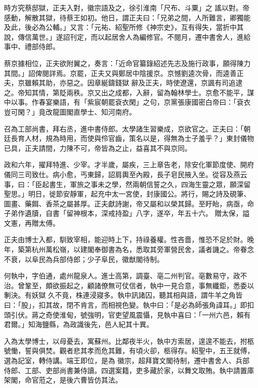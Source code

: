 \begin{pinyinscope}
 時方究蔡邸獄，正夫入對，徽宗語及之，徐引淮南「尺布、斗粟」之
 謠以對。帝感動，解散其獄，待蔡王如初。他日，謂正夫曰：「兄弟之間，人所難言，卿獨能及此，後必為公輔。」又言：「元祐、紹聖所修《神宗史》，互有得失，當折中其說，傳信萬世。」遂詔刊定，而以起居舍人為編修官。不閱月，遷中書舍人，進給事中、禮部侍郎。



 蔡京據相位，正夫欲附翼之，奏言：「近命官纂錄紹述先志及施行政事，願得陳力其間。」詔俾閱詳焉。京罷，正夫又與鄭居中陰援京。京憾劉逵次骨，而逵善正夫，京雖賴其助，亦惡之。因章綖鑄錢獄
 辭及正夫，時使遼還，京諷有司追逮之。帝知其情，第貶兩秩。京又出之成都，入辭，留為翰林學士。京愈不能平，謀中以事。作春宴樂語，有「紫宸朝罷袞衣閑」之句，京黨張康國密白帝曰：「袞衣豈可閑？」竟改龍圖閣直學士、知河南府。



 召為工部尚書，拜右丞，進中書侍郎。太學諸生習樂成，京欲官之。正夫曰：「朝廷長育人材，規為時用，而使與伶官齒，策名以是，得無為士子羞乎？」東封儀物已具，正夫請間，力陳不可，帝皆為之止，益喜其不與京同。



 政和六年，擢拜特進、少宰。才半歲，屬疾，三上章告老，除安化軍節度使、開府儀同三司致仕。病小愈，丐東歸，詔肩輿至內殿，長子皂民掖入坐。從容及燕云事，曰：「臣起書生，軍旅之事未之學，然兩朝信誓之久，四海生靈之眾，願深留聖思。」明日，徙節安靜軍，起充中太一宮使，封康國公。將行，賜之詩及硯筆、圖畫、藥餌、香茶之屬甚厚。正夫獻詩謝，帝又屬和以榮其歸。至盱眙，病亟，命子弟作遺牘，自書「留神根本，深戒持盈」八字，遂卒，年五十六。
 贈太保，謚文憲，再贈太傅。



 正夫由博士入都，馴致宰相，能迎時上下，持祿養權。性吝嗇，惟恐不足於財。晚年，築第杭州萬松嶺，以建閣奉御書為名，悉取其旁軍營民舍，議者譏之。帝眷念不衰，以阜民為兵部侍郎；少子阜民，徽猷閣待制。



 何執中，字伯通，處州龍泉人。進士高第，調臺、亳二州判官。亳數易守，政不治。曾鞏至，頗欲振起之，顧諸僚無可仗信者，執中一見合意，事無纖鉅，悉委以剸決。有妖獄
 久不竟，株連浸寢多。執中訊諸囚，聽其相與語，謂牛羊之角皆曰：「股」，扣其故，閉不肯言，而相視色變。執中曰：「是必為師張角諱耳。」即扣頭引伏。蔣之奇使淮甸，號強明，官吏望風震懾，見執中喜曰：「一州六邑，賴有君爾。」知海鹽縣，為政識後先，邑人紀其十異。



 入為太學博士，以母憂去，寓蘇州。比鄰夜半火，執中方索居，遑遑不能去，拊柩號慟，誓與俱焚。觀者悲其孝而危其難，有頃火卻，柩得存。紹聖中，五王就傅，選為記室，轉侍講。端王即位，是為
 徽宗，超拜寶文閣待制，遷中書舍人、兵部侍郎、工部、吏部尚書兼侍讀。四選案籍，吏多藏於家，以舞文取賄。執中請置庫架閣，命官蒞之，是後六曹皆仿其法。




\end{pinyinscope}
